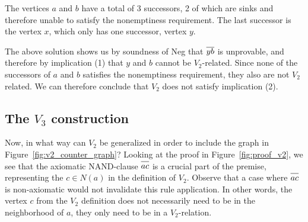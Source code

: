 The vertices $a$ and $b$ have a total of 3 successors, 2 of which are sinks and therefore unable to satisfy the nonemptiness requirement.
The last successor is the vertex $x$, which only has one successor, vertex $y$.\par
\begin{figure}[!h]
  \centering
  \caption{}
  \label{fig:v2_counter_assignment}
\end{figure}
\FloatBarrier
The above solution shows us by soundness of Neg that $\ol{yb}$ is unprovable, and therefore by implication (1) that $y$ and $b$ cannot be $V_2$-related.
Since none of the successors of $a$ and $b$ satisfies the nonemptiness requirement, they also are not $V_2$ related.
We can therefore conclude that $V_2$ does not satisfy implication (2).

\subsection{The $V_3$ construction}
\label{sub:The V3 construction}
Now, in what way can $V_2$ be generalized in order to include the graph in Figure~\ref{fig:v2_counter_graph}?
Looking at the proof in Figure~\ref{fig:proof_v2}, we see that the axiomatic NAND-clause $\ol{ac}$ is a crucial part of the premise, representing the $c \in N(a)$ in the definition of $V_2$.
Observe that a case where $\ol{ac}$ is non-axiomatic would not invalidate this rule application.
In other words, the vertex $c$ from the $V_2$ definition does not necessarily need to be in the neighborhood of $a$, they only need to be in a $V_2$-relation.

